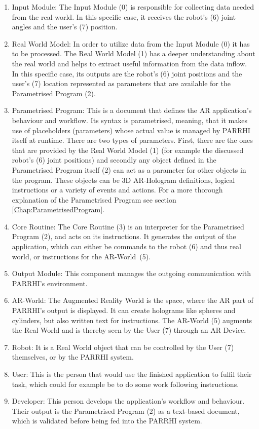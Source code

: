 \begin{enumerate}
	\addtocounter{enumi}{-1}
	\setlength\itemsep{-1em}
	\item Input Module: The Input Module (0) is responsible for collecting data needed from the real world. In this specific case, it  receives the robot's (6) joint angles and the user's (7) position.
	\item Real World Model: In order to utilize data from the Input Module (0) it has to be processed. The Real World Model (1) has a deeper understanding about the real world and helps to extract useful information from the data inflow. In this specific case, its outputs are the robot's (6) joint positions and the user's (7) location represented as parameters that are available for the Parametrised Program (2).
	\item Parametrised Program: This is a document that defines the AR application's behaviour and workflow. Its syntax is parametrised, meaning, that it makes use of placeholders (parameters) whose actual value is managed by PARRHI itself at runtime. There are two types of parameters. First, there are the ones that are provided by the Real World Model (1) (for example the discussed robot's (6) joint positions) and secondly any object defined in the Parametrised Program itself (2) can act as a parameter for other objects in the program. These objects can be 3D AR-Hologram definitions, logical instructions or a variety of events and actions. For a more thorough explanation of the Parametrised Program see section \ref{Chap:ParametrisedProgram}.
	\item Core Routine: The Core Routine (3) is an interpreter for the Parametrised Program (2), and acts on its instructions. It generates the output of the application, which can either be commands to the robot (6) and thus real world, or instructions for the AR-World~(5).
	\item Output Module: This component manages the outgoing communication with PARRHI's environment. 
	\item AR-World: The Augmented Reality World is the space, where the AR part of PARRHI's output is displayed. It can create holograms like spheres and cylinders, but also written text for instructions. The AR-World (5) augments the Real World and is thereby seen by the User (7) through an AR Device.
	\item Robot: It is a Real World object that can be controlled by the User (7) themselves, or by the PARRHI system.
	\item User: This is the person that would use the finished application to fulfil their task, which could for example be to do some work following instructions.
	\item Developer: This person develops the application's workflow and behaviour. Their output is the Parametrised Program (2) as a text-based document, which is validated before being fed into the PARRHI system.
\end{enumerate}

